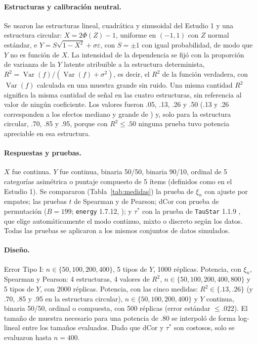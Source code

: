 \documentclass[man,donotrepeattitle,floatsintext]{apa7}
\begin{document}
\paragraph{Estructuras y calibración neutral.} Se usaron las estructuras lineal, cuadrática y sinusoidal del Estudio 1 y una estructura circular: $X=2\Phi(Z)-1$, uniforme en $(-1,1)$ con $Z$ normal estándar, e $Y=S\sqrt{1-X^2}+\sigma\varepsilon$, con $S=\pm1$ con igual probabilidad, de modo que $Y$ no es función de $X$. La intensidad de la dependencia se fijó con la proporción de varianza de la $Y$ latente atribuible a la estructura determinista, $R^2=\operatorname{Var}(f)/(\operatorname{Var}(f)+\sigma^2)$, es decir, el $R^2$ de la función verdadera, con $\operatorname{Var}(f)$ calculada en una muestra grande sin ruido. Una misma cantidad $R^2$ significa la misma cantidad de señal en las cuatro estructuras, sin referencia al valor de ningún coeficiente. Los valores fueron .05, .13, .26 y .50 (.13 y .26 corresponden a los efectos mediano y grande de \textcite{cohen1988}) y, solo para la estructura circular, .70, .85 y .95, porque con $R^2\le .50$ ninguna prueba tuvo potencia apreciable en esa estructura.

\paragraph{Respuestas y pruebas.} $X$ fue continua. $Y$ fue continua, binaria 50/50, binaria 90/10, ordinal de 5 categorías asimétrica o puntaje compuesto de 5 ítems (definidos como en el Estudio 1). Se compararon (Tabla~\ref{tab:medidas}) la prueba de $\xi_n$ con ajuste por empates; las pruebas $t$ de Spearman y de Pearson; dCor con prueba de permutación ($B=199$; \texttt{energy} 1.7.12, \cite{rizzo2024energy}); y $\tau^*$ con la prueba de \texttt{TauStar} 1.1.9 \parencite{weihs2026taustar}, que elige automáticamente el modo continuo, mixto o discreto según los datos. Todas las pruebas se aplicaron a los mismos conjuntos de datos simulados.

\paragraph{Diseño.} Error Tipo I: $n\in\{50,100,200,400\}$, 5 tipos de $Y$, 1000 réplicas. Potencia, con $\xi_n$, Spearman y Pearson: 4 estructuras, 4 valores de $R^2$, $n\in\{50,100,200,400,800\}$ y 5 tipos de $Y$, con 2000 réplicas. Potencia, con las cinco medidas: $R^2\in\{.13,.26\}$ (y .70, .85 y .95 en la estructura circular), $n\in\{50,100,200,400\}$ y $Y$ continua, binaria 50/50, ordinal o compuesta, con 500 réplicas (error estándar $\le .022$). El tamaño de muestra necesario para una potencia de .80 se interpoló de forma log-lineal entre los tamaños evaluados. Dado que dCor y $\tau^*$ son costosos, solo se evaluaron hasta $n=400$.
\end{document}
